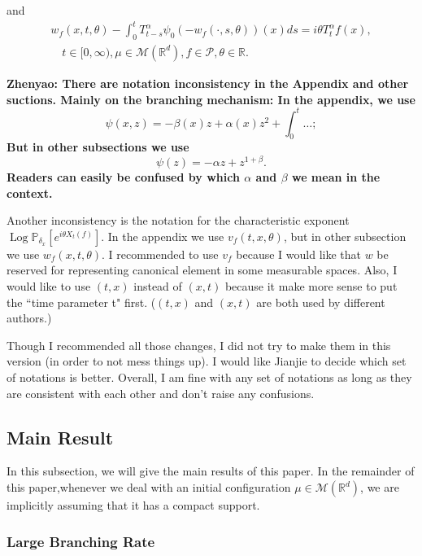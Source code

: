 \documentclass[12pt, a4paper]{amsart}
\theoremstyle{definition}
\numberwithin{equation}{section}
\begin{document}
and
\begin{align}
\label{eq:chareq2}
    w_f(x,t,\theta)-\int_0^t T^{\alpha}_{t-s} \psi_0(-w_f(\cdot,s,\theta))(x)ds=i\theta T^{\alpha}_t f(x),
    \\ \quad t\in [0,\infty), \mu\in \mathcal M(\mathbb R^d), f\in \mathcal P, \theta \in \mathbb R.
\end{align}
    {\bf Zhenyao: There are notation inconsistency in the Appendix and other suctions. Mainly on the branching mechanism: In the appendix, we use
\[
    \psi(x,z)= -\beta(x)z+\alpha(x)z^2 + \int_0^t \dots;
\]
    But in other subsections we use
\[
    \psi(z) = - \alpha z + z^{1+\beta}.
\]
    Readers can easily be confused by which $\alpha$ and $\beta$ we mean in the context.

    Another inconsistency is the notation for the characteristic exponent $\operatorname{Log} \mathbb P_{\delta_x}[e^{i\theta X_t(f)}]$. In the appendix we use $v_f(t,x,\theta)$, but in other subsection we use $w_f(x,t,\theta)$. I recommended to use $v_f$ because I would like that $w$ be reserved for representing canonical element in some measurable spaces. Also, I would like to use $(t,x)$ instead of $(x,t)$ because it make more sense to put the ``time parameter t" first. ($(t,x)$ and $(x,t)$ are both used by different authors.)

    Though I recommended all those changes, I did not try to make them in this version (in order to not mess things up). I would like Jianjie to decide which set of notations is better. Overall, I am fine with any set of notations as long as they are consistent with each other and don't raise any confusions.}

\subsection{Main Result}

In this subsection, we will give the main results of this paper. In the remainder of this paper,whenever we deal with an initial configuration $\mu \in \mathcal{M}(\mathbb{R}^d)$, we are implicitly assuming that it has a compact support.
\subsubsection{Large Branching Rate}
\end{document}
